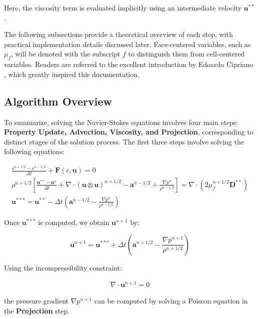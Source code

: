 \documentclass[a4paper]{article}
\begin{document}
Here, the viscosity term is evaluated implicitly using an intermediate velocity $\mathbf{u}^{**}$.

The following subsections provide a theoretical overview of each step, with practical implementation details discussed later. Face-centered variables, such as $\mu_f$, will be denoted with the subscript $f$ to distinguish them from cell-centered variables. Readers are referred to the excellent introduction by Edoardo Cipriano \cite{2024_Cipriano}, which greatly inspired this documentation.

\subsection{Algorithm Overview}
To summarize, solving the Navier-Stokes equations involves four main steps: \textbf{Property Update, Advection, Viscosity, and Projection}, corresponding to distinct stages of the solution process. The first three steps involve solving the following equations:

\begin{gather}
    \frac{c^{n+1/2} - c^{n-1/2}}{\Delta t} 
    + \mathbf{F}(c,\mathbf{u}) = 0 \label{equ:colorfunc} \\
    \rho^{n+1/2} \left[ \frac{\mathbf{u}^{**} - \mathbf{u}^n}{\Delta t} 
    + \nabla \cdot (\mathbf{u} \otimes \mathbf{u})^{n+1/2} 
    - \mathbf{a}^{n-1/2} 
    + \frac{\nabla p^n}{\rho^{n-1/2}} \right] 
    = \nabla \cdot \left( 2\mu^{n+1/2}_f \mathbf{D}^{**} \right)\label{equ:advdiff}\\
    \mathbf{u}^{***} = \mathbf{u}^{**} 
    - \Delta t \left( \mathbf{a}^{n-1/2} 
    - \frac{\nabla p^n}{\rho^{n-1/2}} \right)\label{equ:diffalter}
\end{gather}

Once $\mathbf{u}^{***}$ is computed, we obtain $\mathbf{u}^{n+1}$ by:

\begin{equation}
    \mathbf{u}^{n+1} = \mathbf{u}^{***} 
    + \Delta t \left( \mathbf{a}^{n+1/2} 
    - \frac{\nabla p^{n+1}}{\rho^{n+1/2}} \right)
\end{equation}

Using the incompressibility constraint:

\begin{gather}
    \nabla \cdot \mathbf{u}^{n+1} = 0
\end{gather}

the pressure gradient $\nabla p^{n+1}$ can be computed by solving a Poisson equation in the \textbf{Projection} step.
\end{document}
